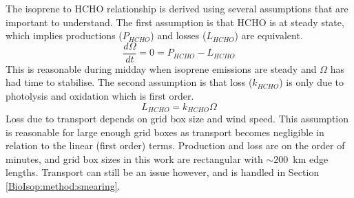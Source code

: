    The isoprene to HCHO relationship is derived using several assumptions that are important to understand.
    The first assumption is that HCHO is at steady state, which implies productions ($P_{HCHO}$) and losses ($L_{HCHO}$) are equivalent.
    \begin{equation}
      \label{BioIsop:method:slope:eqn_steady_state]}
      \frac{d \Omega }{dt} = 0 = P_{HCHO} - L_{HCHO}
    \end{equation}
    This is reasonable during midday when isoprene emissions are steady and $\Omega$ has had time to stabilise.
    The second assumption is that loss ($k_{HCHO}$) is only due to photolysis and oxidation which is first order.%
    \begin{equation}
      \label{BioIsop:method:slope:eqn_loss}
      L_{HCHO}  = k_{HCHO} \Omega %
    \end{equation}
    Loss due to transport depends on grid box size and wind speed.
    This assumption is reasonable for large enough grid boxes as transport becomes negligible in relation to the linear (first order) terms.
    Production and loss are on the order of minutes, and grid box sizes in this work are rectangular with $\sim 200$~km edge lengths. 
    Transport can still be an issue however, and is handled in Section \ref{BioIsop:method:smearing}.
    
